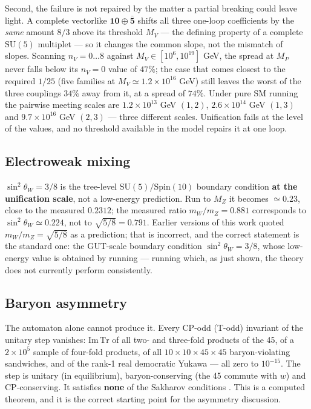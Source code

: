 \documentclass[aps,prd,twocolumn,amsmath,amssymb,superscriptaddress,nofootinbib,floatfix]{revtex4-2}
\begin{document}
Second, the failure is not repaired by the matter a partial breaking
could leave light. A complete vectorlike
\(\mathbf{10}\oplus\bar{\mathbf{5}}\) shifts all three one-loop
coefficients by the \emph{same} amount \(8/3\) above its threshold
\(M_V\) --- the defining property of a complete \(\mathrm{SU}(5)\)
multiplet --- so it changes the common slope, not the mismatch of
slopes. Scanning \(n_V = 0\dots8\) against \(M_V \in [10^6, 10^{19}]\)
GeV, the spread at \(M_P\) never falls below its \(n_V = 0\) value of
\(47\%\); the case that comes closest to the required \(1/25\) (five
families at \(M_V \simeq 1.2\times10^{16}\) GeV) still leaves the worst
of the three couplings \(34\%\) away from it, at a spread of \(74\%\).
Under pure SM running the pairwise meeting scales are
\(1.2\times10^{13}\) GeV \((1,2)\), \(2.6\times10^{14}\) GeV \((1,3)\)
and \(9.7\times10^{16}\) GeV \((2,3)\) --- three different scales.
Unification fails at the level of the values, and no threshold available
in the model repairs it at one loop.

\subsection{Electroweak mixing}\label{electroweak-mixing}

\(\sin^2\theta_W = 3/8\) is the tree-level
\(\mathrm{SU}(5)/\mathrm{Spin}(10)\) boundary condition \textbf{at the
unification scale}, not a low-energy prediction. Run to \(M_Z\) it
becomes \(\simeq 0.23\), close to the measured \(0.2312\); the measured
ratio \(m_W/m_Z = 0.881\) corresponds to
\(\sin^2\theta_W \simeq 0.224\), not to \(\sqrt{5/8} = 0.791\). Earlier
versions of this work quoted \(m_W/m_Z = \sqrt{5/8}\) as a prediction;
that is incorrect, and the correct statement is the standard one: the
GUT-scale boundary condition \(\sin^2\theta_W = 3/8\), whose low-energy
value is obtained by running --- running which, as just shown, the
theory does not currently perform consistently.

\subsection{Baryon asymmetry}\label{baryon-asymmetry}

The automaton alone cannot produce it. Every CP-odd (T-odd) invariant of
the unitary step vanishes: \(\mathrm{Im}\,\mathrm{Tr}\) of all two- and
three-fold products of the 45, of a \(2\times10^5\) sample of four-fold
products, of all \(10\times10\times45\times45\) baryon-violating
sandwiches, and of the rank-1 real democratic Yukawa --- all zero to
\(10^{-15}\). The step is unitary (in equilibrium), baryon-conserving
(the 45 commute with \(w\)) and CP-conserving. It satisfies
\textbf{none} of the Sakharov conditions \cite{ref24}. This is a
computed theorem, and it is the correct starting point for the asymmetry
discussion.
\end{document}
